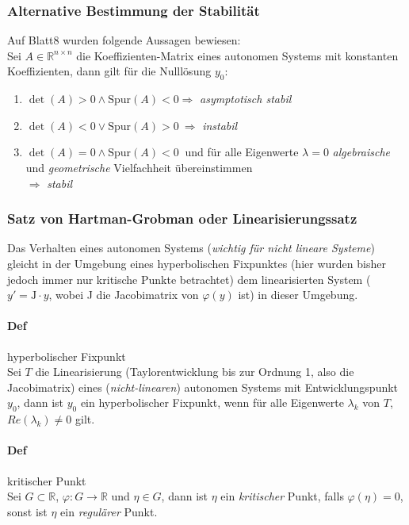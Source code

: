 \subsubsection{Alternative Bestimmung der Stabilität}
Auf Blatt8 wurden folgende Aussagen bewiesen:\\
Sei $A \in \mathbb{R}^{n\times n}$ die Koeffizienten-Matrix eines autonomen Systems mit konstanten Koeffizienten, dann gilt für die Nulllösung $y_0$:
\begin{enumerate}[label=\roman*)]
    \item $\det(A) > 0 \wedge \text{Spur}(A) < 0 \Rightarrow$ \emph{asymptotisch stabil}
    \item $\det(A) < 0 \lor \text{Spur}(A) > 0 \ \Rightarrow$ \emph{instabil}
    \item $\det(A) = 0 \wedge \text{Spur}(A) < 0 \ $ und für alle Eigenwerte $\lambda=0$ \textit{algebraische} und \textit{geometrische} Vielfachheit übereinstimmen \\ $\Rightarrow$ \emph{stabil}
    
\end{enumerate}

\subsubsection{Satz von Hartman-Grobman oder Linearisierungssatz}
Das Verhalten eines autonomen Systems (\textit{wichtig für nicht lineare 
Systeme}) gleicht in der Umgebung eines hyperbolischen Fixpunktes (hier 
wurden bisher jedoch immer nur kritische Punkte betrachtet) dem 
linearisierten System ($y' = \text{J}\cdot y$, wobei J die Jacobimatrix von 
$\varphi(y)$ ist) in dieser Umgebung.

\paragraph{Def}hyperbolischer Fixpunkt\\
Sei $T$ die Linearisierung (Taylorentwicklung bis zur Ordnung 1, also die Jacobimatrix) eines (\textit{nicht-linearen}) autonomen Systems mit Entwicklungspunkt $y_0$, dann ist $y_0$ ein hyperbolischer Fixpunkt, wenn für alle Eigenwerte $\lambda_k$ von $T$, $Re(\lambda_k) \neq 0$ gilt.

\paragraph{Def} kritischer Punkt\\
Sei $G \subset 	\mathbb{R}$, $\varphi : G \rightarrow \mathbb{R}$ und $\eta 
\in G$, dann ist $\eta$ ein \textit{kritischer} Punkt, falls $\varphi(\eta) = 0$, sonst ist $\eta$ ein \textit{regulärer} Punkt.

